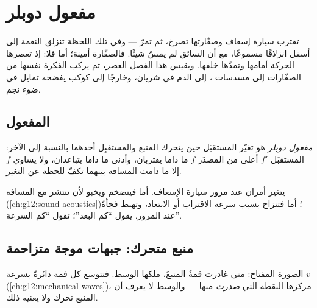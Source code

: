 \chapter{مفعول دوبلر}\label{ch:g12:doppler-effect}

تقترب سيارة إسعاف وصفّارتها تصرخ، ثم تمرّ --- وفي تلك اللحظة تنزلق النغمة
إلى أسفل انزلاقًا مسموعًا، مع أن السائق لم يمسّ شيئًا. فالصفّارة أمينة؛ أما 
فلا: إذ تعصرها الحركة أمامها وتمدّها خلفها. ويقيس هذا الفصل العصر،
ثم يركب الفكرة نفسها من الصفّارات إلى مسدسات ، إلى الدم في شريان، وخارجًا إلى
كوكب يفضحه تمايل في ضوء نجم.

\section{المفعول}

\begin{definition}\label{def:g12:doppler-effect:doppler}
\emph{مفعول دوبلر} هو تغيّر  المستقبَل
 حين يتحرك المنبع والمستقبِل أحدهما بالنسبة إلى الآخر:  المستقبَل
$f'$ أعلى من  المصدَر $f$ ما داما يقتربان، وأدنى ما داما
يتباعدان، ولا يساوي $f$ إلا ما دامت المسافة بينهما تكفّ للحظة عن التغير.
\end{definition}

\begin{remark}\label{rem:g12:doppler-effect:pitch}
يتغير أمران عند مرور سيارة الإسعاف. أما \emph{} فيتضخم ويخبو لأن
 تنتشر مع المسافة (\cref{ch:g12:sound-acoustics})؛ أما \emph{} فتنزاح
بسبب سرعة الاقتراب أو الابتعاد، وتهبط فجأةً عند المرور.
 يقول ``كم البعد''؛  تقول ``كم السرعة''.
\end{remark}

\section{منبع متحرك: جبهات موجة متزاحمة}

الصورة المفتاح: متى غادرت قمةٌ المنبعَ، ملكها الوسط. فتتوسع كل قمة
دائرةً بسرعة  $v$ (\cref{ch:g12:mechanical-waves})، مركزها النقطة التي
\emph{صدرت} منها --- والوسط لا يعرف أن المنبع تحرك ولا يعنيه ذلك.

